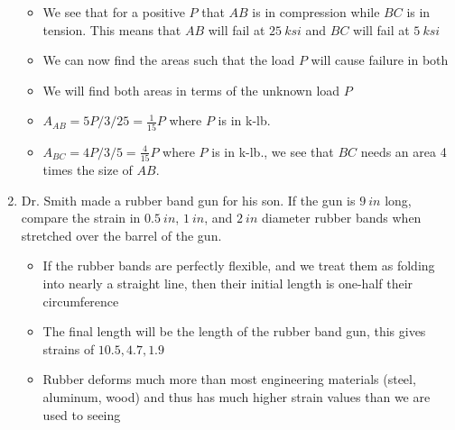 \documentclass[12pt, oneside]{article}
\let\US\SI
\begin{document}
\begin{enumerate}
\begin{itemize}
\begin{figure}[H]
			\end{figure}
		\item We see that for a positive $P$ that $AB$ is in compression while $BC$ is in tension. This means that $AB$ will fail at $ 	\US{25}{ksi}  $ and $BC$ will fail at $ 	\US{5}{ksi}  $
		\item We can now find the areas such that the load $P$ will cause failure in both
		\item We will find both areas in terms of the unknown load $P$
		\item $A_{AB} = 5P/3/25 = \frac{1}{15}P$ where $P$ is in k-lb.
		\item $A_{BC} = 4P/3/5 = \frac{4}{15}P$ where $P$ is in k-lb., we see that $BC$ needs an area 4 times the size of $AB$.
		\end{itemize}

	\item %
		Dr. Smith made a rubber band gun for his son.
		If the gun is $\US{9}{in}$ long, compare the strain in $\US{0.5}{in}$,  $\US{1}{in}$, and $\US{2}{in}$ diameter rubber bands when stretched over the barrel of the gun.  
		\begin{itemize}
			\item If the rubber bands are perfectly flexible, and we treat them as folding into nearly a straight line, then their initial length is one-half their circumference
			\item The final length will be the length of the rubber band gun, this gives strains of $10.5, 4.7, 1.9$
			\item Rubber deforms much more than most engineering materials (steel, aluminum, wood) and thus has much higher strain values than we are used to seeing
		\end{itemize}


\end{enumerate}
\end{document}
